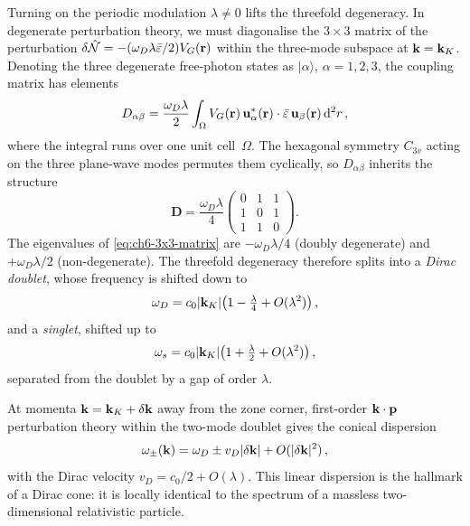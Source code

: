Turning on the periodic modulation $\lambda\neq 0$ lifts the
threefold degeneracy.  In degenerate perturbation theory, we must
diagonalise the $3\times 3$ matrix of the perturbation
$\delta\hat{\mathcal{N}}=-(\omega_D\lambda\bar\varepsilon/2)V_G(\mathbf{r})$ within the
three-mode subspace at $\mathbf{k}=\mathbf{k}_K$.  Denoting the three degenerate
free-photon states as $|\alpha\rangle$, $\alpha=1,2,3$, the coupling
matrix has elements \cite{haldane2008possible}
\begin{equation}\label{eq:ch6-coupling-matrix}
  D_{\alpha\beta}
  = \frac{\omega_D\lambda}{2}
  \int_{\Omega}V_G(\mathbf{r})\,
  \mathbf{u}^*_\alpha(\mathbf{r})\cdot
  \bar\varepsilon\,\mathbf{u}_\beta(\mathbf{r})\,\mathrm{d}^2 r\,,
\end{equation}
where the integral runs over one unit cell~$\Omega$.  The hexagonal
symmetry $C_{3v}$ acting on the three plane-wave modes permutes them
cyclically, so $D_{\alpha\beta}$ inherits the structure
\begin{equation}\label{eq:ch6-3x3-matrix}
  \mathbf{D} = \frac{\omega_D\lambda}{4}
  \begin{pmatrix}
    0 & 1 & 1 \\ 1 & 0 & 1 \\ 1 & 1 & 0
  \end{pmatrix}.
\end{equation}
The eigenvalues of \eqref{eq:ch6-3x3-matrix} are
$-\omega_D\lambda/4$ (doubly degenerate) and
$+\omega_D\lambda/2$ (non-degenerate).  The threefold degeneracy
therefore splits into a \emph{Dirac doublet}, whose frequency is
shifted down to
\begin{equation}\label{eq:ch6-omega-D}
  \omega_D
  = c_0|\mathbf{k}_K|\bigl(1-\tfrac{\lambda}{4}+O(\lambda^2)\bigr)\,,
\end{equation}
and a \emph{singlet}, shifted up to
\begin{equation}\label{eq:ch6-omega-singlet}
  \omega_s
  = c_0|\mathbf{k}_K|\bigl(1+\tfrac{\lambda}{2}+O(\lambda^2)\bigr)\,,
\end{equation}
separated from the doublet by a gap of order $\lambda$.

At momenta $\mathbf{k}=\mathbf{k}_K+\delta\mathbf{k}$ away from the zone corner,
first-order $\mathbf{k}\cdot\mathbf{p}$ perturbation theory within the
two-mode doublet gives the conical dispersion
\begin{equation}\label{eq:ch6-dirac-dispersion}
  \omega_\pm(\mathbf{k}) = \omega_D \pm v_D|\delta\mathbf{k}| + O(|\delta\mathbf{k}|^2)\,,
\end{equation}
with the Dirac velocity $v_D=c_0/2+O(\lambda)$.  This linear
dispersion is the hallmark of a Dirac cone: it is locally identical to
the spectrum of a massless two-dimensional relativistic particle.

